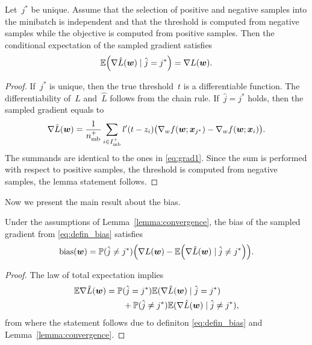 \begin{lemma}\label{lemma:convergence}
  Let~$j^*$ be unique. Assume that the selection of positive and negative samples into the minibatch is independent and that the threshold is computed from negative samples while the objective is computed from positive samples. Then the conditional expectation of the sampled gradient satisfies
  \begin{equation*}
    \EE\Brac{\nabla \hat L(\bm{w}) \mid \hat j=j^*} =  \nabla L(\bm{w}).
  \end{equation*}
\end{lemma}
\begin{proof}
  If~$j^*$ is unique, then the true threshold~$t$ is a differentiable function. The differentiability of~$L$ and~$\hat L$ follows from the chain rule. If~$\hat j=j^*$ holds, then the sampled gradient equals to
  \begin{equation}\label{eq:grad_min_aux}
    \nabla \hat L(\bm{w})= \frac{1}{n_{\rm mb}^+}\sum_{i\in I_{\rm mb}^+}l'(t-z_i)\big(\nabla_w f(\bm{w};\bm{x}_{j^*}) - \nabla_w f(\bm{w};\bm{x}_i) \big).
  \end{equation}
  The summands are identical to the ones in \eqref{eq:grad1}. Since the sum is performed with respect to positive samples, the threshold is computed from negative samples, the lemma statement follows.
\end{proof}

Now we present the main result about the bias.

\begin{theorem}\label{theorem:convergence}
  Under the assumptions of Lemma~\ref{lemma:convergence}, the bias of the sampled gradient from \eqref{eq:defin_bias} satisfies
  \begin{equation}\label{eq:comp_bias}
    \bias(\bm{w}) = \PP(\hat j\neq j^*) \Brac{\nabla L(\bm{w}) - \EE\Brac{\nabla \hat L(\bm{w}) \mid \hat j\neq j^*}}.
  \end{equation}
\end{theorem}
\begin{proof}
  The law of total expectation implies
  \begin{equation*}
    \begin{aligned}
      \mathbb{E} \nabla \hat L(\bm{w})
      & = \mathbb{P}(\hat j=j^*)\mathbb{E}(\nabla \hat L(\bm{w}) \mid \hat j=j^*) \\
      & \qquad + \mathbb{P}(\hat j\neq j^*)\mathbb{E}(\nabla \hat L(\bm{w}) \mid \hat j\neq j^*),
    \end{aligned}
  \end{equation*}
  from where the statement follows due to definiton \eqref{eq:defin_bias} and Lemma~\ref{lemma:convergence}.
\end{proof}

